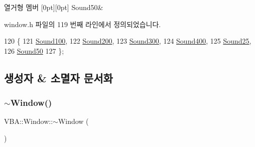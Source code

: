 \begin{DoxyEnumFields}{열거형 멤버}
[0pt][0pt]{}\mbox{\label{class_v_b_a_1_1_window_a50ce3c1e3f6a9ce3ed41b5c2a5535115ae418399aca07a338a64219a63c715f2c}} 
Sound50&\\
\hline

\end{DoxyEnumFields}


window.\+h 파일의 119 번째 라인에서 정의되었습니다.


\begin{DoxyCode}
120   \{
121     \mbox{\hyperlink{class_v_b_a_1_1_window_a50ce3c1e3f6a9ce3ed41b5c2a5535115a6ab8db10fff1e9cf79007e97aaa72e28}{Sound100}},
122     \mbox{\hyperlink{class_v_b_a_1_1_window_a50ce3c1e3f6a9ce3ed41b5c2a5535115a8d4bdfa41f7d38c0c856c34e5aa131d4}{Sound200}},
123     \mbox{\hyperlink{class_v_b_a_1_1_window_a50ce3c1e3f6a9ce3ed41b5c2a5535115aac7811cf06a9480720502cb8dfd0940b}{Sound300}},
124     \mbox{\hyperlink{class_v_b_a_1_1_window_a50ce3c1e3f6a9ce3ed41b5c2a5535115a9e94c8b32c7bfc04d29bfeccdeb922fb}{Sound400}},
125     \mbox{\hyperlink{class_v_b_a_1_1_window_a50ce3c1e3f6a9ce3ed41b5c2a5535115a71693cce7a27885b931b5db27c1e57bb}{Sound25}},
126     \mbox{\hyperlink{class_v_b_a_1_1_window_a50ce3c1e3f6a9ce3ed41b5c2a5535115ae418399aca07a338a64219a63c715f2c}{Sound50}}
127   \};
\end{DoxyCode}


\subsection{생성자 \& 소멸자 문서화}
\mbox{\label{class_v_b_a_1_1_window_a3bf5880da605d1190d685a4f7796ca51}} 
\subsubsection{\texorpdfstring{$\sim$\+Window()}{~Window()}}
{\footnotesize\ttfamily V\+B\+A\+::\+Window\+::$\sim$\+Window (\begin{DoxyParamCaption}{ }\end{DoxyParamCaption})\hspace{0.3cm}{\ttfamily [virtual]}}




